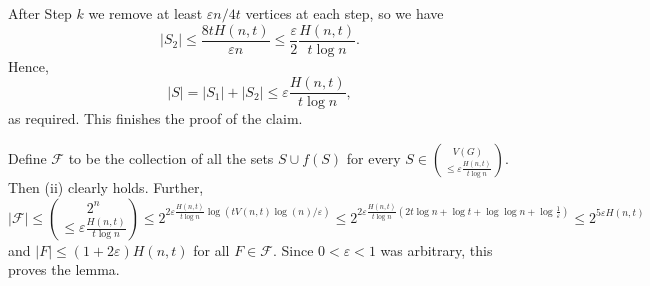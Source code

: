\documentclass[11pt]{article}
\newtheorem{lemma}[theorem]{Lemma}
\numberwithin{equation}{section}
\def\eps{\varepsilon}
\begin{document}
After Step $k$ we remove at least 
${\eps n}/{4t}$ vertices at each step, so we have $$|S_{2}|\leq \frac{8tH(n,t)}{\eps n}\leq \frac{\eps}{2}\frac{H(n,t)}{t\log n}.$$ 
Hence,  $$|S|=|S_1|+|S_2|\leq \eps\frac{H(n,t)}{t\log n},$$ as required. This finishes the proof of the claim.

\medskip

Define $\mathcal F$ to be the collection of all the sets $S \cup f(S)$ for every $S \in \binom{V(G)}{\leq \eps\frac{H(n,t)}{t\log n}} $. Then (ii) clearly holds. Further,
$$
|\mathcal{F}|  \leq \binom{2^n}{\leq  \eps\frac{H(n,t)}{t\log n}}\leq2^{2\eps\frac{H(n,t)}{t\log n}\log (t V(n,t)\log (n)/\eps)}\leq 2^{2\eps\frac{H(n,t)}{t\log n}(2t\log n + \log t + \log \log n + \log\frac{1}{\eps})}
\leq 2^{5 \eps H(n,t)}
$$
and $|F| \leq (1+2 \eps )H (n,t)$ for all $F \in \mathcal F$. Since $0<\eps <1$ was arbitrary, this proves the lemma.



\endproof





\end{document}
